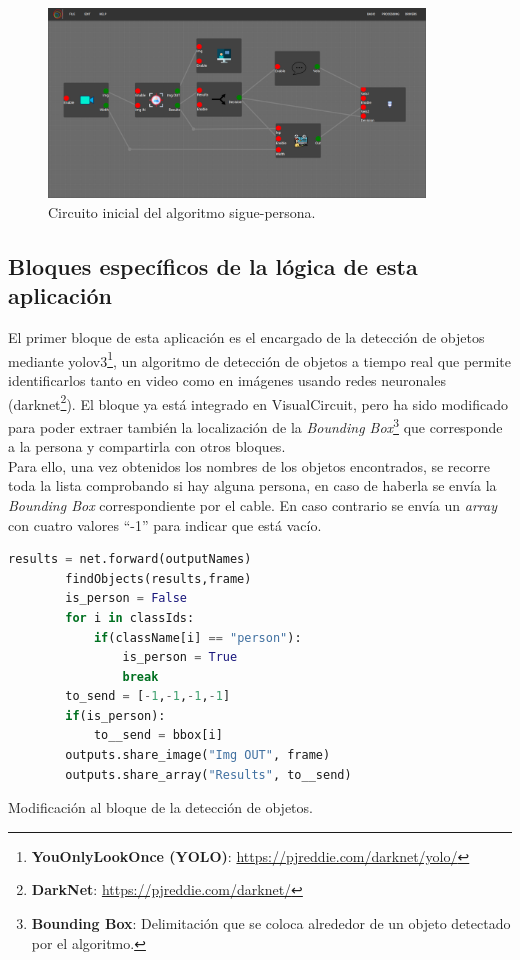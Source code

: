 \begin{figure} [H]
    \begin{center}
        \includegraphics[width=10cm]{figs/c5/follow_person_initial.png}
    \end{center}
    \caption[Circuito sigue-personas inicial]{Circuito inicial del algoritmo sigue-persona.}
    \label{fig:initial_follow_person}
\end{figure}

\subsection{Bloques específicos de la lógica de esta aplicación}
\label{subsec:FP1_blocks}

El primer bloque de esta aplicación es el encargado de la detección de objetos mediante
yolov3\footnote{\textbf{YouOnlyLookOnce (YOLO)}: \url{https://pjreddie.com/darknet/yolo/}}, un algoritmo de detección de objetos a tiempo real que
permite identificarlos tanto en video como en imágenes usando redes neuronales (darknet\footnote{\textbf{DarkNet}: \url{https://pjreddie.com/darknet/}}).
El bloque ya está integrado en VisualCircuit, pero ha sido modificado para poder extraer también la localización de la
\textit{Bounding Box}\footnote{\textbf{Bounding Box}: Delimitación que se coloca alrededor de un objeto detectado por el algoritmo.}
que corresponde a la persona y compartirla con otros bloques.\\

Para ello, una vez obtenidos los nombres de los objetos encontrados, se recorre toda la lista comprobando si hay alguna persona,
en caso de haberla se envía la \textit{Bounding Box} correspondiente por el cable. En caso contrario se envía un \textit{array} con
cuatro valores ``-1'' para indicar que está vacío.

\begin{code}[H]
    \begin{lstlisting}[language=python]
        results = net.forward(outputNames)
        findObjects(results,frame)
        is_person = False
        for i in classIds:
            if(className[i] == "person"):
                is_person = True
                break
        to_send = [-1,-1,-1,-1]
        if(is_person):
            to__send = bbox[i]
        outputs.share_image("Img OUT", frame)
        outputs.share_array("Results", to__send)
    \end{lstlisting}
    \caption[Modificación al bloque detector de objetos]{Modificación al bloque de la detección de objetos.}
    \label{cod:mod_object_detector}
\end{code}

